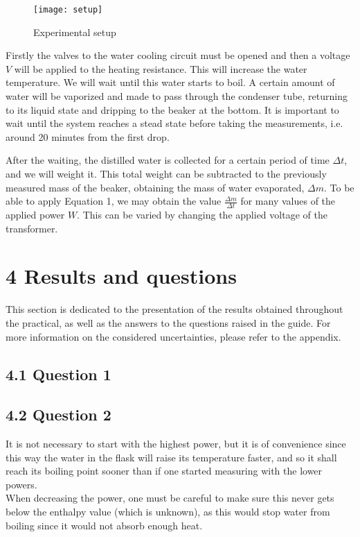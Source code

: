 \documentclass[a4paper, 12pt]{article}
\begin{document}
\begin{figure}[ht!]
\centering
\texttt{[image: setup]}
\caption{Experimental setup}
\end{figure}


Firstly the valves to the water cooling circuit must be opened and then a voltage $V$ will be applied to the heating resistance. This will increase the water temperature. We will wait until this water starts to boil. A certain amount of water will be vaporized and made to pass through the condenser tube, returning to its liquid state and dripping to the beaker at the bottom. It is important to wait until the system reaches a stead state before taking the measurements, i.e. around 20 minutes from the first drop.

After the waiting, the distilled water is collected for a certain period of time $\Delta t$, and we will weight it. This total weight can be subtracted to the previously measured mass of the beaker, obtaining the mass of water evaporated, $\Delta m$. To be able to apply Equation 1, we may obtain the value $\frac{\Delta m}{\Delta t}$ for many values of the applied power $W$. This can be varied by changing the applied voltage of the transformer.

\section{4 Results and questions}
This section is dedicated to the presentation of the results obtained throughout the practical, as well as the answers to the questions raised in the guide. For more information on the considered uncertainties, please refer to the appendix.
\subsection{4.1 Question 1}
\subsection{4.2 Question 2}
It is not necessary to start with the highest power, but it is of convenience since this way the water in the flask will raise its temperature faster, and so it shall reach its boiling point sooner than if one started measuring with the lower powers. \\

When decreasing the power, one must be careful to make sure this never gets below the enthalpy value (which is unknown), as this would stop water from boiling since it would not absorb enough heat.
\end{document}
